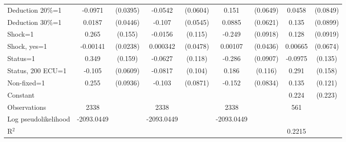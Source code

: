 \begin{tabular}{l|cccccc|cc}
Deduction 20\%=1&  -0.0971\sym{**} & (0.0395)&  -0.0542         & (0.0604)&    0.151\sym{**} & (0.0649)&   0.0458         & (0.0849)\\
Deduction 30\%=1&   0.0187         & (0.0446)&   -0.107\sym{**} & (0.0545)&   0.0885         & (0.0621)&    0.135         & (0.0899)\\
Shock=1         &    0.265\sym{*}  &  (0.155)&  -0.0156         &  (0.115)&   -0.249\sym{***}& (0.0918)&    0.128         & (0.0919)\\
Shock, yes=1    & -0.00141         & (0.0238)& 0.000342         & (0.0478)&  0.00107         & (0.0436)&  0.00665         & (0.0674)\\
Status=1        &    0.349\sym{**} &  (0.159)&  -0.0627         &  (0.118)&   -0.286\sym{***}& (0.0907)&  -0.0975         &  (0.135)\\
Status, 200 ECU=1&   -0.105\sym{*}  & (0.0609)&  -0.0817         &  (0.104)&    0.186         &  (0.116)&    0.291\sym{*}  &  (0.158)\\
Non-fixed=1     &    0.255\sym{***}& (0.0936)&   -0.103         & (0.0871)&   -0.152\sym{*}  & (0.0834)&    0.135         &  (0.121)\\
Constant        &                  &         &                  &         &                  &         &    0.224         &  (0.223)\\
\hline
Observations    &     2338         &         &     2338         &         &     2338         &         &      561         &         \\
Log pseudolikelihood  &  -2093.0449  &         &      -2093.0449            &         &    -2093.0449              &         &           &   \\ 
R$^2$      &                  &         &                  &         &                  &         &      0.2215     &   \\ 


\end{tabular}

